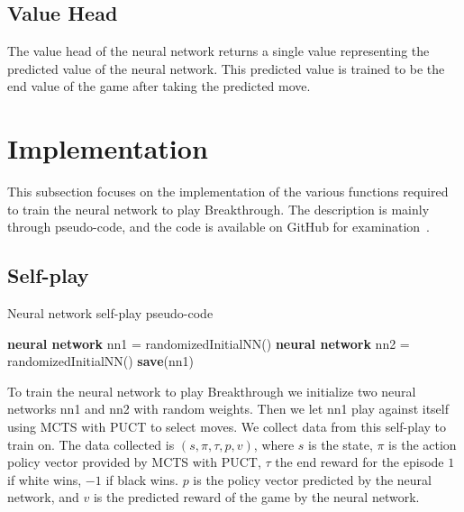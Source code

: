 \subsection{Value Head}

The value head of the neural network returns a single value representing the predicted value of the neural network. This predicted value is trained to be the end value of the game after taking the predicted move.

\section{Implementation}

This subsection focuses on the implementation of the various functions required to train the neural network to play Breakthrough. The description is mainly through pseudo-code, and the code is available on GitHub for examination~\cite{siggi:github}.

\subsection{Self-play}

\begin{algorithm}[t]
    \caption{Neural network self-play pseudo-code}
    \label{alg:selfplay}
    \begin{algorithmic}[1]
        \STATE \textbf{neural network} nn1 = randomizedInitialNN()
        \STATE \textbf{neural network} nn2 = randomizedInitialNN()
        \WHILE{\TRUE}
        \ELSE
        \ENDIF
        \STATE \textbf{save}(nn1)
        \ENDWHILE
    \end{algorithmic}
\end{algorithm}

To train the neural network to play Breakthrough we initialize two neural networks nn1 and nn2 with random weights. Then we let nn1 play against itself using MCTS with PUCT to select moves. We collect data from this self-play to train on. The data collected is $(s, \pi, \tau, p, v)$, where $s$ is the state, $\pi$ is the action policy vector provided by MCTS with PUCT, $\tau$ the end reward for the episode $1$ if white wins, $-1$ if black wins. $p$ is the policy vector predicted by the neural network, and $v$ is the predicted reward of the game by the neural network.

